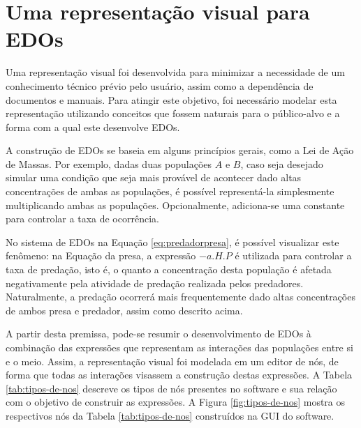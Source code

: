 \documentclass[
	12pt,				%
	openright,			%
	oneside,			%
	a4paper,			%
	main=brazil,
	english,			%
	]{ufsj-abntex2}
\begin{document}
\section{Uma representação visual para EDOs}
\label{sec:representacao-visual-edo}

Uma representação visual foi desenvolvida para minimizar a necessidade de um conhecimento técnico prévio pelo usuário, assim como a dependência de documentos e manuais. Para atingir este objetivo, foi necessário modelar esta representação utilizando conceitos que fossem naturais para o público-alvo e a forma com a qual este desenvolve EDOs.

A construção de EDOs se baseia em alguns princípios gerais, como a Lei de Ação de Massas. Por exemplo, dadas duas populações $A$ e $B$, caso seja desejado simular uma condição que seja mais provável de acontecer dado altas concentrações de ambas as populações, é possível representá-la simplesmente multiplicando ambas as populações. Opcionalmente, adiciona-se uma constante para controlar a taxa de ocorrência.

No sistema de EDOs na Equação \ref{eq:predadorpresa}, é possível visualizar este fenômeno: na Equação da presa, a expressão \(-a.H.P\) é utilizada para controlar a taxa de predação, isto é, o quanto a concentração desta população é afetada negativamente pela atividade de predação realizada pelos predadores. Naturalmente, a predação ocorrerá mais frequentemente dado altas concentrações de ambos presa e predador, assim como descrito acima.

A partir desta premissa, pode-se resumir o desenvolvimento de EDOs à combinação das expressões que representam as interações das populações entre si e o meio. Assim, a representação visual foi modelada em um editor de nós, de forma que todas as interações visassem a construção destas expressões. A Tabela \ref{tab:tipos-de-nos} descreve os tipos de nós presentes no software e sua relação com o objetivo de construir as expressões. A Figura \ref{fig:tipos-de-nos} mostra os respectivos nós da Tabela \ref{tab:tipos-de-nos} construídos na GUI do software.
\end{document}
